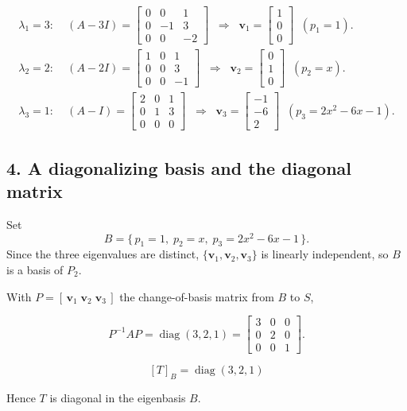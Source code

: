 \documentclass{report}
\begin{document}
{\[
    \begin{aligned}
        \lambda_{1}=3: & \;
        (A-3I)
        =\begin{bmatrix}
             0 & 0  & 1  \\
             0 & -1 & 3  \\
             0 & 0  & -2
         \end{bmatrix}
        \;\;\Longrightarrow\;\;
        \mathbf{v}_{1}
        =\begin{bmatrix}1\\0\\0\end{bmatrix}
        \;\;(p_{1}=1).      \\[6pt]
        \lambda_{2}=2: & \;
        (A-2I)
        =\begin{bmatrix}
             1 & 0 & 1  \\
             0 & 0 & 3  \\
             0 & 0 & -1
         \end{bmatrix}
        \;\;\Longrightarrow\;\;
        \mathbf{v}_{2}
        =\begin{bmatrix}0\\1\\0\end{bmatrix}
        \;\;(p_{2}=x).      \\[6pt]
        \lambda_{3}=1: & \;
        (A-I)
        =\begin{bmatrix}
             2 & 0 & 1 \\
             0 & 1 & 3 \\
             0 & 0 & 0
         \end{bmatrix}
        \;\;\Longrightarrow\;\;
        \mathbf{v}_{3}
        =\begin{bmatrix}-1\\-6\\2\end{bmatrix}
        \;\;(p_{3}=2x^{2}-6x-1).
    \end{aligned}
\]

\subsection*{4.  A diagonalizing basis and the diagonal matrix}

Set
\[
    B=\{\,p_{1}=1,\;p_{2}=x,\;p_{3}=2x^{2}-6x-1\,\}.
\]
Since the three eigenvalues are distinct,
\(\{\mathbf{v}_{1},\mathbf{v}_{2},\mathbf{v}_{3}\}\) is linearly independent,
so \(B\) is a basis of \(P_{2}\).

With \(P=[\,\mathbf{v}_{1}\;\mathbf{v}_{2}\;\mathbf{v}_{3}\,]\) the
change-of-basis matrix from \(B\) to \(S\),

\[
    P^{-1}AP
    =\operatorname{diag}(3,2,1)
    =\begin{bmatrix}
        3 & 0 & 0 \\
        0 & 2 & 0 \\
        0 & 0 & 1
    \end{bmatrix}.
\]

\[
    [T]_{B}=\operatorname{diag}(3,2,1)
\]

Hence \(T\) is diagonal in the eigenbasis \(B\).

}
\end{document}
